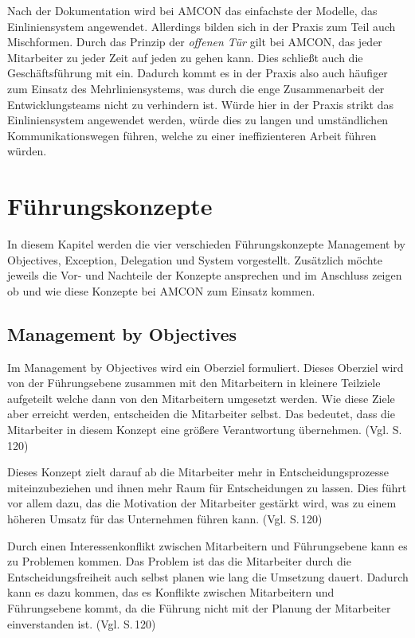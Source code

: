         Nach der Dokumentation wird bei AMCON das einfachste der Modelle, das Einliniensystem angewendet. Allerdings
        bilden sich in der Praxis zum Teil auch Mischformen. Durch das Prinzip der \emph{offenen Tür} gilt bei AMCON,
        das jeder Mitarbeiter zu jeder Zeit auf jeden zu gehen kann. Dies schließt auch die Geschäftsführung mit ein.
        Dadurch kommt es in der Praxis also auch häufiger zum Einsatz des Mehrliniensystems, was durch die enge 
        Zusammenarbeit der Entwicklungsteams nicht zu verhindern ist. Würde hier in der Praxis strikt das 
        Einliniensystem angewendet werden, würde dies zu langen und umständlichen Kommunikationswegen führen, welche zu
        einer ineffizienteren Arbeit führen würden.

\section{Führungskonzepte} \label{Konzepte}
    In diesem Kapitel werden die vier verschieden Führungskonzepte Management by Objectives, Exception, Delegation und
    System vorgestellt. Zusätzlich möchte jeweils die Vor- und Nachteile der Konzepte ansprechen und im Anschluss zeigen
    ob und wie diese Konzepte bei AMCON zum Einsatz kommen.
    
    \subsection{Management by Objectives} \label{Objectives}
        Im Management by Objectives wird ein Oberziel formuliert. Dieses Oberziel wird von der Führungsebene zusammen 
        mit den Mitarbeitern in kleinere Teilziele aufgeteilt welche dann von den Mitarbeitern umgesetzt werden. Wie 
        diese Ziele aber erreicht werden, entscheiden die Mitarbeiter selbst. Das bedeutet, dass die Mitarbeiter in 
        diesem Konzept eine größere Verantwortung übernehmen. (Vgl. \cite{Woehe2020} S.\,120)

        Dieses Konzept zielt darauf ab die Mitarbeiter mehr in Entscheidungsprozesse miteinzubeziehen und ihnen mehr 
        Raum für Entscheidungen zu lassen. Dies führt vor allem dazu, das die Motivation der Mitarbeiter gestärkt wird,
        was zu einem höheren Umsatz für das Unternehmen führen kann. (Vgl. \cite{Woehe2020} S.\,120)

        Durch einen Interessenkonflikt zwischen Mitarbeitern und Führungsebene kann es zu Problemen kommen. Das Problem
        ist das die Mitarbeiter durch die Entscheidungsfreiheit auch selbst planen wie lang die Umsetzung dauert. 
        Dadurch kann es dazu kommen, das es Konflikte zwischen Mitarbeitern und Führungsebene kommt, da die Führung 
        nicht mit der Planung der Mitarbeiter einverstanden ist. (Vgl. \cite{Woehe2020} S.\,120)

